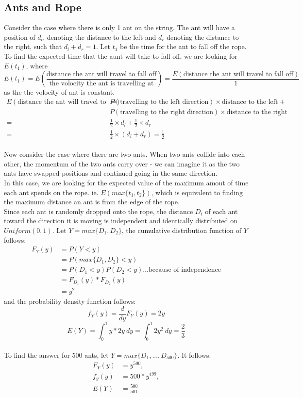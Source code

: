 \documentclass{article}
\begin{document}
\subsection{Ants and Rope}
Consider the case where there is only 1 ant on the string. The ant will 
have a position of $d_l$, denoting the distance to the left and $d_r$ denoting 
the distance to the right, such that $d_l+d_r = 1$.\newline 
Let $t_1$ be the time for the ant to fall off the rope. To find
 the expected time that the aunt will take to fall off, 
 we are
looking for $E(t_1)$, where
$$E(t_1) = E(\frac{\text{distance the ant will travel to fall off}}{\text{the volocity the ant is travelling at}})=\frac{E(\text{distance the ant will travel to fall off})}{1}$$
as the the volocity of ant is constant. 
\begin{align*}
    E(\text{distance the ant will travel to fall off})=&
    P(\text{travelling to the left direction})\times
    \text{distance to the left}+\\
    &P(\text{travelling to the right direction})\times
    \text{distance to the right}\\
    =&\frac{1}{2}\times d_l + \frac{1}{2} \times d_r\\
    =&\frac{1}{2}\times (d_l+d_r)
    =\frac{1}{2}
\end{align*}
\\
Now consider the case where there are two ants. When two ants collide into each other,
the momentum of the two ants carry over - we can imagine it as the two ants have swapped positions and
continued going in the same direction.\\
In this case, we are looking for the expected value of the maximum amout of time each ant spends on the rope.
ie. $E(max\{t_1, t_2\})$, which is equivalent to finding the maximum distance an ant is from the edge of the rope.\\
Since each ant is randomly dropped onto the rope, the distance $D_i$ of each ant toward the direction it is moving is 
independent and identically distributed on $Uniform(0,1)$. 
Let $Y = max\{D_1, D_2\}$, the cumulative distribution function of $Y$ follows:
\begin{align*}
    F_Y(y) &= P(Y<y)\\
    &= P(max\{D_1, D_2\}<y)\\
    &= P(D_1<y)P(D_2<y) \dots \text{because of independence}\\
    &= F_{D_1}(y)*F_{D_2}(y)\\
    &= y^2
\end{align*}
and the probability density function follows:
$$f_Y(y) = \frac{d}{dy}F_Y(y) = 2y$$
$$E(Y) = \int_{0}^{1} y * 2y\ dy = \int_{0}^{1}2y^2\ dy = \frac{2}{3}$$
\\
To find the answer for 500 ants, let $Y = max\{D_1,..., D_{500}\}$. It follows:
\begin{align*}
    F_Y(y) &= y^{500},\\
    f_y(y) &= 500*y^{499},\\
    E(Y) &= \frac{500}{501}
\end{align*}
\end{document}
